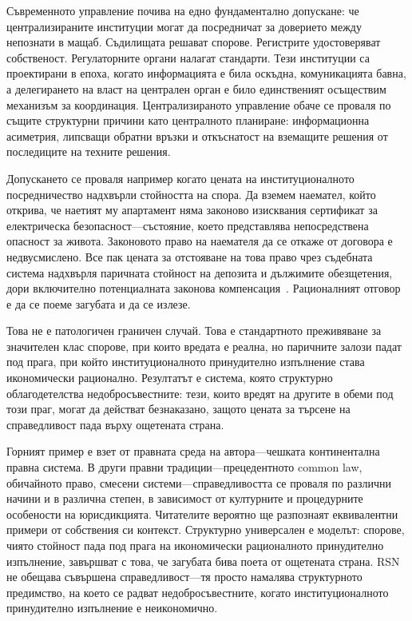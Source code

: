 \documentclass[11pt,a4paper,twocolumn]{article}
\begin{document}
Съвременното управление почива на едно фундаментално допускане: че централизираните институции могат да посредничат за доверието между непознати в мащаб. Съдилищата решават спорове. Регистрите удостоверяват собственост. Регулаторните органи налагат стандарти. Тези институции са проектирани в епоха, когато информацията е била оскъдна, комуникацията бавна, а делегирането на власт на централен орган е било единственият осъществим механизъм за координация. Централизираното управление обаче се проваля по същите структурни причини като централното планиране: информационна асиметрия, липсващи обратни връзки и откъснатост на вземащите решения от последиците на техните решения.

Допускането се проваля например когато цената на институционалното посредничество надхвърли стойността на спора. Да вземем наемател, който открива, че наетият му апартамент няма законово изисквания сертификат за електрическа безопасност---състояние, което представлява непосредствена опасност за живота. Законовото право на наемателя да се откаже от договора е недвусмислено. Все пак цената за отстояване на това право чрез съдебната система надхвърля паричната стойност на депозита и дължимите обезщетения, дори включително потенциалната законова компенсация~\cite{czcourtfees}. Рационалният отговор е да се поеме загубата и да се излезе.

Това не е патологичен граничен случай. Това е стандартното преживяване за значителен клас спорове, при които вредата е реална, но паричните залози падат под прага, при който институционалното принудително изпълнение става икономически рационално. Резултатът е система, която структурно облагодетелства недобросъвестните: тези, които вредят на другите в обеми под този праг, могат да действат безнаказано, защото цената за търсене на справедливост пада върху ощетената страна.

Горният пример е взет от правната среда на автора---чешката континентална правна система. В други правни традиции---прецедентното common law, обичайното право, смесени системи---справедливостта се проваля по различни начини и в различна степен, в зависимост от културните и процедурните особености на юрисдикцията. Читателите вероятно ще разпознаят еквивалентни примери от собствения си контекст. Структурно универсален е моделът: спорове, чиято стойност пада под прага на икономически рационалното принудително изпълнение, завършват с това, че загубата бива поета от ощетената страна. RSN не обещава съвършена справедливост---тя просто намалява структурното предимство, на което се радват недобросъвестните, когато институционалното принудително изпълнение е неикономично.
\end{document}
